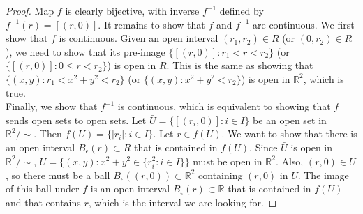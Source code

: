 \documentclass{article}
\begin{document}
\begin{enumerate}
\begin{enumerate}
\begin{proof}
          Map $f$ is clearly bijective, with inverse $f^{-1}$ defined by
          $f^{-1}(r)=[(r,0)]$. It remains to show that $f$ and $f^{-1}$ are
          continuous. We first show that $f$ is continuous. Given an open
          interval $(r_1,r_2)\in R$ (or $(0,r_2)\in R$), we need to show
          that its pre-image $\{[(r,0)]:r_1<r<r_2\}$ (or $\{[(r,0)]:0\leq
          r<r_2\}$) is open in $R$. This is the same as showing that
          $\{(x,y):r_1<x^2+y^2<r_2\}$ (or $\{(x,y):x^2+y^2<r_2\}$) is open
          in $\mathbb{R}^2$, which is true. \\

          Finally, we show that $f^{-1}$ is continuous, which is equivalent
          to showing that $f$ sends open sets to open sets. Let
          $\bar{U}=\{[(r_i,0)]:i\in I\}$ be an open set in
          $\mathbb{R}^2/\sim$. Then $f(U)=\{|r_i|:i\in I\}$. Let $r\in f(U)$.
          We want to show that there is an open interval
          $B_\epsilon(r)\subset R$ that is contained in $f(U)$.
          Since $\bar{U}$ is open in $\mathbb{R}^2/\sim$,
          $U=\{(x,y):x^2+y^2\in\{r_i^2:i\in I\}\}$ must be open in
          $\mathbb{R}^2$. Also, $(r,0)\in U$, so there must be a ball
          $B_\epsilon((r,0))\subset\mathbb{R}^2$ containing $(r,0)$ in $U$.
          The image of this ball under $f$ is an open interval
          $B_\epsilon(r)\subset\mathbb{R}$ that is contained in $f(U)$ and
          that contains $r$, which is the interval we are looking for.

        \end{proof}
    \end{enumerate}
\end{enumerate}
\end{document}
